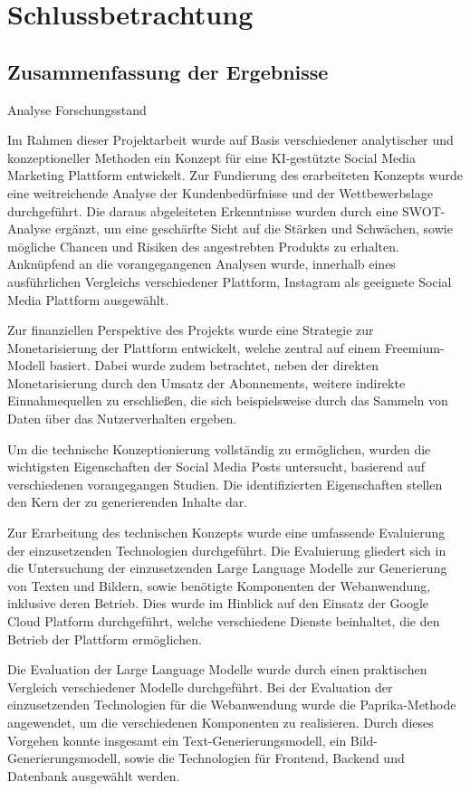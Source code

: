 \newpage
\section{Schlussbetrachtung}

\subsection{Zusammenfassung der Ergebnisse}

Analyse Forschungsstand

Im Rahmen dieser Projektarbeit wurde auf Basis verschiedener analytischer und konzeptioneller Methoden ein Konzept für eine KI-gestützte Social Media Marketing Plattform entwickelt.
Zur Fundierung des erarbeiteten Konzepts wurde eine weitreichende Analyse der Kundenbedürfnisse und der Wettbewerbslage durchgeführt.
Die daraus abgeleiteten Erkenntnisse wurden durch eine SWOT-Analyse ergänzt, um eine geschärfte Sicht auf die Stärken und Schwächen, sowie mögliche Chancen und Risiken des angestrebten Produkts zu erhalten.
Anknüpfend an die vorangegangenen Analysen wurde, innerhalb eines ausführlichen Vergleichs verschiedener Plattform, Instagram als geeignete Social Media Plattform ausgewählt.

Zur finanziellen Perspektive des Projekts wurde eine Strategie zur Monetarisierung der Plattform entwickelt, welche zentral auf einem Freemium-Modell basiert.
Dabei wurde zudem betrachtet, neben der direkten Monetarisierung durch den Umsatz der Abonnements, weitere indirekte Einnahmequellen zu erschließen, die sich beispielsweise durch das Sammeln von Daten über das Nutzerverhalten ergeben.

Um die technische Konzeptionierung vollständig zu ermöglichen, wurden die wichtigsten Eigenschaften der Social Media Posts untersucht, basierend auf verschiedenen vorangegangen Studien.
Die identifizierten Eigenschaften stellen den Kern der zu generierenden Inhalte dar.

Zur Erarbeitung des technischen Konzepts wurde eine umfassende Evaluierung der einzusetzenden Technologien durchgeführt.
Die Evaluierung gliedert sich in die Untersuchung der einzusetzenden Large Language Modelle zur Generierung von Texten und Bildern, sowie benötigte Komponenten der Webanwendung, inklusive deren Betrieb.
Dies wurde im Hinblick auf den Einsatz der Google Cloud Platform durchgeführt, welche verschiedene Dienste beinhaltet, die den Betrieb der Plattform ermöglichen.

Die Evaluation der Large Language Modelle wurde durch einen praktischen Vergleich verschiedener Modelle durchgeführt.
Bei der Evaluation der einzusetzenden Technologien für die Webanwendung wurde die Paprika-Methode angewendet, um die verschiedenen Komponenten zu realisieren.
Durch dieses Vorgehen konnte insgesamt ein Text-Generierungsmodell, ein Bild-Generierungsmodell, sowie die Technologien für Frontend, Backend und Datenbank ausgewählt werden.

